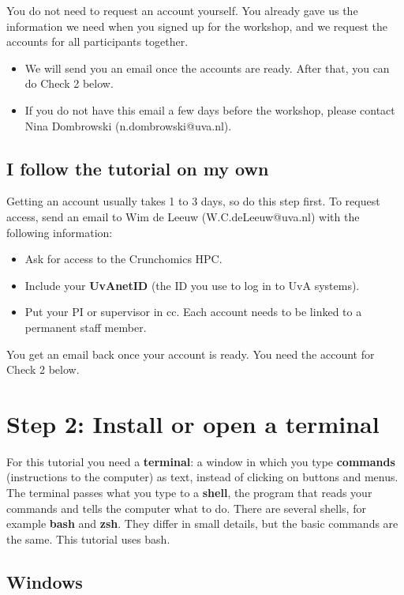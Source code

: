 \documentclass[
  letterpaper,
  DIV=11,
  numbers=noendperiod]{scrreprt}
\providecommand{\tightlist}{%
  \setlength{\itemsep}{0pt}\setlength{\parskip}{0pt}}
\begin{document}
You do not need to request an account yourself. You already gave us the
information we need when you signed up for the workshop, and we request
the accounts for all participants together.

\begin{itemize}
\tightlist
\item
  We will send you an email once the accounts are ready. After that, you
  can do Check 2 below.
\item
  If you do not have this email a few days before the workshop, please
  contact Nina Dombrowski (n.dombrowski@uva.nl).
\end{itemize}

\subsection{I follow the tutorial on my own}

Getting an account usually takes 1 to 3 days, so do this step first. To
request access, send an email to Wim de Leeuw (W.C.deLeeuw@uva.nl) with
the following information:

\begin{itemize}
\tightlist
\item
  Ask for access to the Crunchomics HPC.
\item
  Include your \textbf{UvAnetID} (the ID you use to log in to UvA
  systems).
\item
  Put your PI or supervisor in cc. Each account needs to be linked to a
  permanent staff member.
\end{itemize}

You get an email back once your account is ready. You need the account
for Check 2 below.

\section{Step 2: Install or open a
terminal}\label{step-2-install-or-open-a-terminal}

For this tutorial you need a \textbf{terminal}: a window in which you
type \textbf{commands} (instructions to the computer) as text, instead
of clicking on buttons and menus. The terminal passes what you type to a
\textbf{shell}, the program that reads your commands and tells the
computer what to do. There are several shells, for example \textbf{bash}
and \textbf{zsh}. They differ in small details, but the basic commands
are the same. This tutorial uses bash.

\subsection{Windows}\label{windows}
\end{document}
